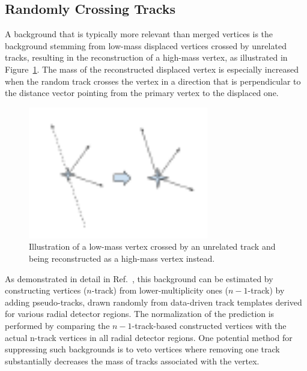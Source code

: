 \subsection{Randomly Crossing Tracks}

A background that is typically more relevant than merged vertices is the background stemming from low-mass displaced vertices crossed by unrelated tracks, resulting in the reconstruction of a high-mass vertex, as illustrated in Figure~\ref{fig:randomcrossing}. The mass of the reconstructed displaced vertex is especially increased when the random track crosses the vertex in a direction that is perpendicular to the distance vector pointing from the primary vertex to the displaced one.

\begin{figure}[h]
  \centering
  \includegraphics[width=0.7\textwidth]{figures/randomcrossing.pdf}
  \caption{Illustration of a low-mass vertex crossed by an unrelated track and being reconstructed as a high-mass vertex instead.}
  \label{fig:randomcrossing}
\end{figure}

As demonstrated in detail in Ref.~\cite{Aaboud:2017iio,Aad:2015rba}, this background can be estimated by constructing vertices ($n$-track) from lower-multiplicity ones ($n-1$-track) by adding pseudo-tracks, drawn randomly from data-driven track templates derived for various radial detector regions. The normalization of the prediction is performed by comparing the $n-1$-track-based constructed vertices with the actual n-track vertices in all radial detector regions. One potential method for suppressing such backgrounds is to veto vertices where removing one track substantially decreases the mass of tracks associated with the vertex.


